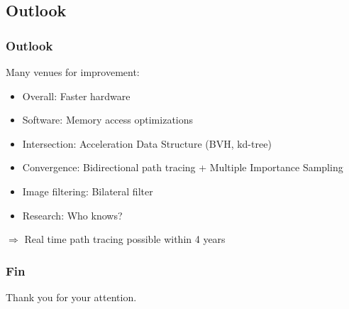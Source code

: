\documentclass{beamer}
\begin{document}
    \subsection{Outlook}
    \begin{frame}
        \frametitle{Outlook}
        Many venues for improvement:
        \pause
        \begin{itemize}
            \item Overall: Faster hardware
                \pause
            \item Software: Memory access optimizations
                \pause
            \item Intersection: Acceleration Data Structure (BVH, kd-tree)
                \pause
            \item Convergence: Bidirectional path tracing + Multiple Importance Sampling
                \pause
            \item Image filtering: Bilateral filter
                \pause
            \item Research: Who knows?
        \end{itemize}
        \pause
        \(\Longrightarrow\) Real time path tracing possible within 4 years
    \end{frame}

    \begin{frame}
        \frametitle{Fin}
        Thank you for your attention.
    \end{frame}
    
\end{document}
